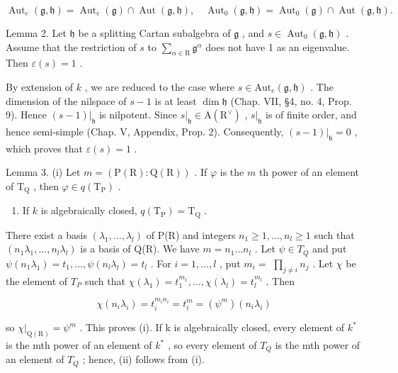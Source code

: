 \[
\operatorname{Aut} _ {e} (\mathfrak {g}, \mathfrak {h}) = \operatorname{Aut} _ {e} (\mathfrak {g}) \cap \operatorname{Aut} (\mathfrak {g}, \mathfrak {h}), \quad \operatorname{Aut} _ {0} (\mathfrak {g}, \mathfrak {h}) = \operatorname{Aut} _ {0} (\mathfrak {g}) \cap \operatorname{Aut} (\mathfrak {g}, \mathfrak {h}).
\]

Lemma 2. Let \(\mathfrak{h}\) be a splitting Cartan subalgebra of \(\mathfrak{g}\) , and \(s \in \operatorname{Aut}_0(\mathfrak{g}, \mathfrak{h})\) . Assume that the restriction of \(s\) to \(\sum_{\alpha \in \mathrm{R}} \mathfrak{g}^\alpha\) does not have 1 as an eigenvalue. Then \(\varepsilon(s) = 1\) .

By extension of \(k\) , we are reduced to the case where \(s \in \mathrm{Aut}_e(\mathfrak{g}, \mathfrak{h})\) . The dimension of the nilspace of \(s - 1\) is at least \(\dim \mathfrak{h}\) (Chap. VII, §4, no. 4, Prop. 9). Hence \((s - 1)|_{\mathfrak{h}}\) is nilpotent. Since \(s|_{\mathfrak{h}} \in \mathrm{A}(\mathrm{R}^\vee)\) , \(s|_{\mathfrak{h}}\) is of finite order, and hence semi-simple (Chap. V, Appendix, Prop. 2). Consequently, \((s - 1)|_{\mathfrak{h}} = 0\) , which proves that \(\varepsilon(s) = 1\) .

Lemma 3. (i) Let \(m = (\mathrm{P}(\mathrm{R}) : \mathrm{Q}(\mathrm{R}))\) . If \(\varphi\) is the \(m\) th power of an element of \(\mathrm{T}_{\mathrm{Q}}\) , then \(\varphi \in q(\mathrm{T}_{\mathrm{P}})\) .

\begin{enumerate}
\def\labelenumi{(\roman{enumi})}
\setcounter{enumi}{1}
\tightlist
\item
  If \(k\) is algebraically closed, \(q(\mathrm{T}_{\mathrm{P}}) = \mathrm{T}_{\mathrm{Q}}\) .
\end{enumerate}

There exist a basis \((\lambda_{1},\ldots,\lambda_{l})\) of P(R) and integers \(n_{1}\geq1,\ldots,n_{l}\geq1\) such that \((n_{1}\lambda_{1},\ldots,n_{l}\lambda_{l})\) is a basis of Q(R). We have \(m=n_{1}\ldots n_{l}\) . Let \(\psi\in T_{Q}\) and put \(\psi(n_{1}\lambda_{1})=t_{1},\ldots,\psi(n_{l}\lambda_{l})=t_{l}\) . For \(i=1,\ldots,l\) , put \(m_{i}=\) \(\prod_{j \neq i} n_j\) . Let \(\chi\) be the element of \(T_P\) such that \(\chi(\lambda_1) = t_1^{m_1}, \ldots, \chi(\lambda_l) = t_l^{m_l}\) . Then

\[
\chi (n _ {i} \lambda_ {i}) = t _ {i} ^ {m _ {i} n _ {i}} = t _ {i} ^ {m} = (\psi^ {m}) (n _ {i} \lambda_ {i})
\]

so \(\chi|_{\mathrm{Q}(\mathrm{R})}=\psi^{m}\) . This proves (i). If k is algebraically closed, every element of \(k^{*}\) is the mth power of an element of \(k^{*}\) , so every element of \(T_{Q}\) is the mth power of an element of \(T_{Q}\) ; hence, (ii) follows from (i).


